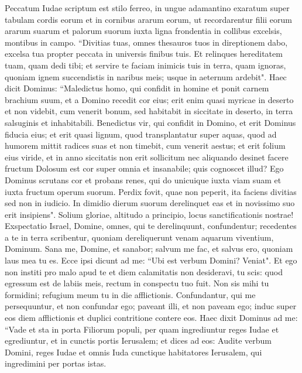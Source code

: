 \begin{biblechapter}  
\verse Peccatum Iudae scriptum est stilo ferreo, in ungue adamantino exaratum super tabulam cordis eorum et in cornibus ararum eorum, 
\verse ut recordarentur filii eorum ararum suarum et palorum suorum iuxta ligna frondentia in collibus excelsis, 
\verse montibus in campo. “Divitias tuas, omnes thesauros tuos in direptionem dabo, excelsa tua propter peccata in universis finibus tuis. 
\verse Et relinques hereditatem tuam, quam dedi tibi; et servire te faciam inimicis tuis in terra, quam ignoras, quoniam ignem succendistis in naribus meis; usque in aeternum ardebit". 
\verse Haec dicit Dominus: “Maledictus homo, qui confidit in homine et ponit carnem brachium suum, et a Domino recedit cor eius; 
\verse erit enim quasi myricae in deserto et non videbit, cum venerit bonum, sed habitabit in siccitate in deserto, in terra salsuginis et inhabitabili. 
\verse Benedictus vir, qui confidit in Domino, et erit Dominus fiducia eius; 
\verse et erit quasi lignum, quod transplantatur super aquas, quod ad humorem mittit radices suas et non timebit, cum venerit aestus; et erit folium eius viride, et in anno siccitatis non erit sollicitum nec aliquando desinet facere fructum 
\verse Dolosum est cor super omnia et insanabile; quis cognoscet illud? 
\verse Ego Dominus scrutans cor et probans renes, qui do unicuique iuxta viam suam et iuxta fructum operum suorum. 
\verse Perdix fovit, quae non peperit, ita faciens divitias sed non in iudicio. In dimidio dierum suorum derelinquet eas et in novissimo suo erit insipiens". 
\verse Solium gloriae, altitudo a principio, locus sanctificationis nostrae! 
\verse Exspectatio Israel, Domine, omnes, qui te derelinquunt, confundentur; recedentes a te in terra scribentur, quoniam dereliquerunt venam aquarum viventium, Dominum. 
\verse Sana me, Domine, et sanabor; salvum me fac, et salvus ero, quoniam laus mea tu es. 
\verse Ecce ipsi dicunt ad me: “Ubi est verbum Domini? Veniat". 
\verse Et ego non institi pro malo apud te et diem calamitatis non desideravi, tu scis: quod egressum est de labiis meis, rectum in conspectu tuo fuit. 
\verse Non sis mihi tu formidini; refugium meum tu in die afflictionis. 
\verse Confundantur, qui me persequuntur, et non confundar ego; paveant illi, et non paveam ego; induc super eos diem afflictionis et duplici contritione contere eos. 
\verse Haec dixit Dominus ad me: “Vade et sta in porta Filiorum populi, per quam ingrediuntur reges Iudae et egrediuntur, et in cunctis portis Ierusalem; 
\verse et dices ad eos: Audite verbum Domini, reges Iudae et omnis Iuda cunctique habitatores Ierusalem, qui ingredimini per portas istas. 

\end{biblechapter}
